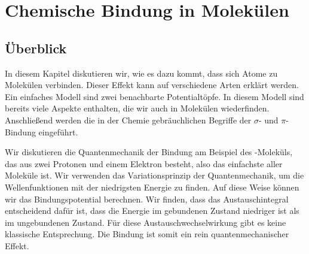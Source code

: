\renewcommand{\lastmod}{10. Dezember 2024} 
\renewcommand{\chapterauthors}{Markus Lippitz}

\chapter{Chemische Bindung in Molekülen}













\section{Überblick}

In diesem Kapitel diskutieren wir, wie es dazu kommt, dass sich Atome zu Molekülen verbinden. Dieser Effekt kann auf verschiedene Arten erklärt werden. Ein einfaches Modell sind zwei benachbarte Potentialtöpfe. In diesem Modell sind bereits viele Aspekte enthalten, die wir auch in Molekülen wiederfinden. Anschließend werden die in der Chemie gebräuchlichen Begriffe der $\sigma$- und $\pi$-Bindung eingeführt.
 
Wir diskutieren die Quantenmechanik der Bindung am Beispiel des -Moleküls, das aus zwei Protonen und einem Elektron besteht, also das einfachste aller Moleküle ist. Wir verwenden das Variationsprinzip der Quantenmechanik, um die Wellenfunktionen mit der niedrigsten Energie zu finden. Auf diese Weise können wir das Bindungspotential berechnen. Wir finden, dass das Austauschintegral entscheidend dafür ist, dass die Energie im gebundenen Zustand niedriger ist als im ungebundenen Zustand. Für diese Austauschwechselwirkung gibt es keine klassische Entsprechung. Die Bindung ist somit ein rein quantenmechanischer Effekt.

